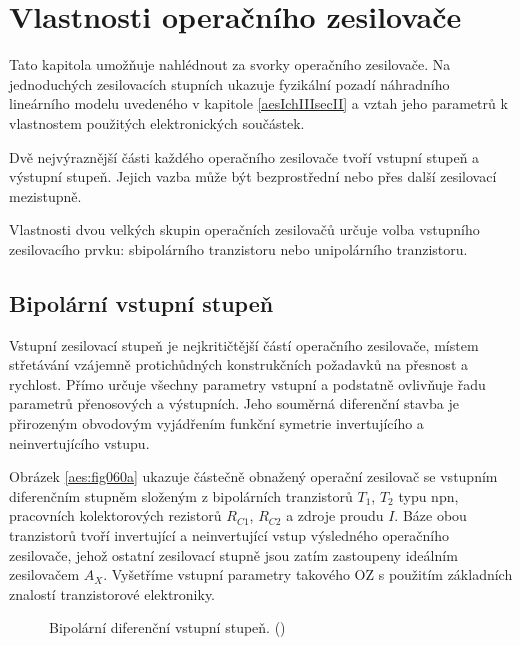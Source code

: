  \section{Vlastnosti operačního zesilovače}\label{aesIchIIIsecIII}
    Tato kapitola umožňuje nahlédnout za svorky operačního zesilovače. Na jednoduchých zesilovacích
    stupních ukazuje fyzikální pozadí náhradního lineárního modelu uvedeného v kapitole
    \ref{aesIchIIIsecII} a vztah jeho parametrů k vlastnostem použitých elektronických součástek.

    Dvě nejvýraznější části každého operačního zesilovače tvoří vstupní stupeň a výstupní stupeň.
    Jejich vazba může být bezprostřední nebo přes další zesilovací mezistupně.

    Vlastnosti dvou velkých skupin operačních zesilovačů určuje volba vstupního zesilovacího prvku:
    sbipolárního tranzistoru nebo unipolárního tranzistoru.

    \subsection{Bipolární vstupní stupeň}\label{aesIchIIIsecIIIssecI}
      Vstupní zesilovací stupeň je nejkritičtější částí operačního zesilovače, místem střetávání
      vzájemně protichůdných konstrukčních požadavků na přesnost a rychlost. Přímo určuje všechny
      parametry vstupní a podstatně ovlivňuje řadu parametrů přenosových a výstupních. Jeho souměrná
      diferenční stavba je přirozeným obvodovým vyjádřením funkční symetrie invertujícího a
      neinvertujícího vstupu.

      Obrázek \ref{aes:fig060a} ukazuje částečně obnažený operační zesilovač se vstupním diferenčním
      stupněm složeným z bipolárních tranzistorů \(T_1\), \(T_2\) typu npn, pracovních kolektorových
      rezistorů \(R_{C1}\), \(R_{C2}\) a zdroje proudu \(I\). Báze obou tranzistorů tvoří
      invertující a neinvertující vstup výsledného operačního zesilovače, jehož ostatní zesilovací
      stupně jsou zatím zastoupeny ideálním zesilovačem \(A_X\). Vyšetříme vstupní parametry
      takového OZ s použitím základních znalostí tranzistorové elektroniky.

      \begin{figure}[ht!]  %
        \centering
          {}      
        \newline                                              
          {}                                        
        \caption{Bipolární diferenční vstupní stupeň.  
                 (\cite[s.~37]{Dostal})}
                \label{aes:fig060}
      \end{figure}

